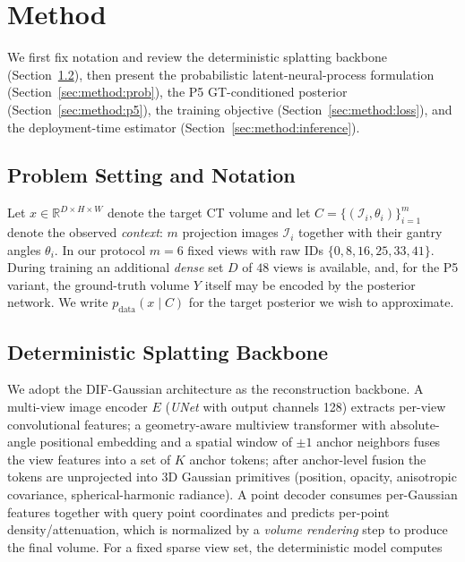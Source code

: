 
\section{Method}
\label{sec:method}

We first fix notation and review the deterministic splatting backbone
(Section~\ref{sec:method:backbone}), then present the probabilistic
latent-neural-process formulation (Section~\ref{sec:method:prob}), the
P5 GT-conditioned posterior (Section~\ref{sec:method:p5}), the training
objective (Section~\ref{sec:method:loss}), and the deployment-time
estimator (Section~\ref{sec:method:inference}).

\subsection{Problem Setting and Notation}
\label{sec:method:problem}

Let $x\in\mathbb{R}^{D\times H\times W}$ denote the target CT volume and
let $C=\{(\mathcal{I}_i,\theta_i)\}_{i=1}^{m}$ denote the observed
\emph{context}: $m$ projection images $\mathcal{I}_i$ together with
their gantry angles $\theta_i$. In our protocol $m=6$ fixed views with
raw IDs $\{0,8,16,25,33,41\}$. During training an additional
\emph{dense} set $D$ of $48$ views is available, and, for the P5
variant, the ground-truth volume $Y$ itself may be encoded by the
posterior network. We write $p_{\mathrm{data}}(x\mid C)$ for the target
posterior we wish to approximate.

\subsection{Deterministic Splatting Backbone}
\label{sec:method:backbone}

We adopt the DIF-Gaussian architecture \cite{lin2024difgaussian} as the
reconstruction backbone. A multi-view image encoder $E$ (\emph{UNet} with
output channels 128) extracts per-view convolutional features; a
geometry-aware multiview transformer with absolute-angle positional
embedding and a spatial window of $\pm1$ anchor neighbors fuses the view
features into a set of $K$ anchor tokens; after anchor-level fusion the
tokens are unprojected into 3D Gaussian primitives (position, opacity,
anisotropic covariance, spherical-harmonic radiance). A point decoder
consumes per-Gaussian features together with query point coordinates and
predicts per-point density/attenuation, which is normalized by a
\emph{volume rendering} step to produce the final volume. For a fixed
sparse view set, the deterministic model computes

